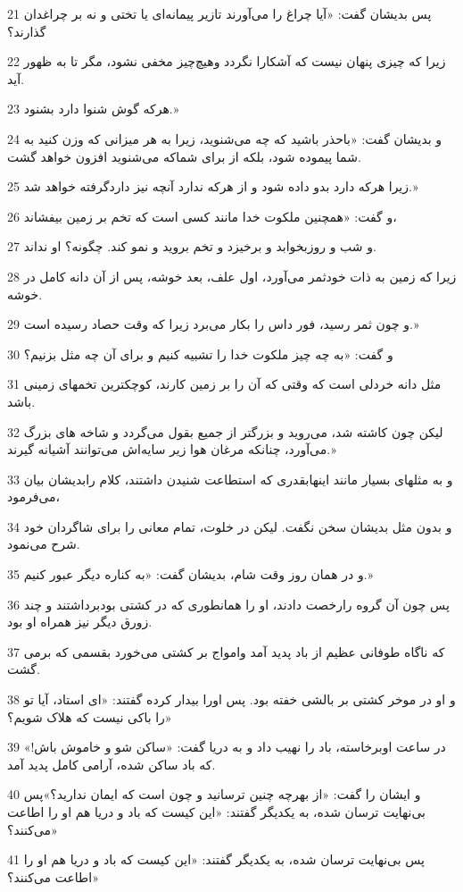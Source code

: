 \par 21 پس بدیشان گفت: «آیا چراغ را می‌آورند تازیر پیمانه‌ای یا تختی و نه بر چراغدان گذارند؟
\par 22 زیرا که چیزی پنهان نیست که آشکارا نگردد وهیچ‌چیز مخفی نشود، مگر تا به ظهور آید.
\par 23 هرکه گوش شنوا دارد بشنود.»
\par 24 و بدیشان گفت: «باحذر باشید که چه می‌شنوید، زیرا به هر میزانی که وزن کنید به شما پیموده شود، بلکه از برای شماکه می‌شنوید افزون خواهد گشت.
\par 25 زیرا هر‌که دارد بدو داده شود و از هر‌که ندارد آنچه نیز داردگرفته خواهد شد.»
\par 26 و گفت: «همچنین ملکوت خدا مانند کسی است که تخم بر زمین بیفشاند،
\par 27 و شب و روزبخوابد و برخیزد و تخم بروید و نمو کند. چگونه؟ او نداند.
\par 28 زیرا که زمین به ذات خودثمر می‌آورد، اول علف، بعد خوشه، پس از آن دانه کامل در خوشه.
\par 29 و چون ثمر رسید، فور داس را بکار می‌برد زیرا که وقت حصاد رسیده است.»
\par 30 و گفت: «به چه چیز ملکوت خدا را تشبیه کنیم و برای آن چه مثل بزنیم؟
\par 31 مثل دانه خردلی است که وقتی که آن را بر زمین کارند، کوچکترین تخمهای زمینی باشد.
\par 32 لیکن چون کاشته شد، می‌روید و بزرگتر از جمیع بقول می‌گردد و شاخه های بزرگ می‌آورد، چنانکه مرغان هوا زیر سایه‌اش می‌توانند آشیانه گیرند.»
\par 33 و به مثلهای بسیار مانند اینهابقدری که استطاعت شنیدن داشتند، کلام رابدیشان بیان می‌فرمود،
\par 34 و بدون مثل بدیشان سخن نگفت. لیکن در خلوت، تمام معانی را برای شاگردان خود شرح می‌نمود.
\par 35 و در همان روز وقت شام، بدیشان گفت: «به کناره دیگر عبور کنیم.»
\par 36 پس چون آن گروه رارخصت دادند، او را همانطوری که در کشتی بودبرداشتند و چند زورق دیگر نیز همراه او بود.
\par 37 که ناگاه طوفانی عظیم از باد پدید آمد وامواج بر کشتی می‌خورد بقسمی که برمی گشت.
\par 38 و او در موخر کشتی بر بالشی خفته بود. پس اورا بیدار کرده گفتند: «ای استاد، آیا تو را باکی نیست که هلاک شویم؟»
\par 39 در ساعت اوبرخاسته، باد را نهیب داد و به دریا گفت: «ساکن شو و خاموش باش!» که باد ساکن شده، آرامی کامل پدید آمد.
\par 40 و ایشان را گفت: «از بهر‌چه چنین ترسانید و چون است که ایمان ندارید؟»پس بی‌نهایت ترسان شده، به یکدیگر گفتند: «این کیست که باد و دریا هم او را اطاعت می‌کنند؟»
\par 41 پس بی‌نهایت ترسان شده، به یکدیگر گفتند: «این کیست که باد و دریا هم او را اطاعت می‌کنند؟»

